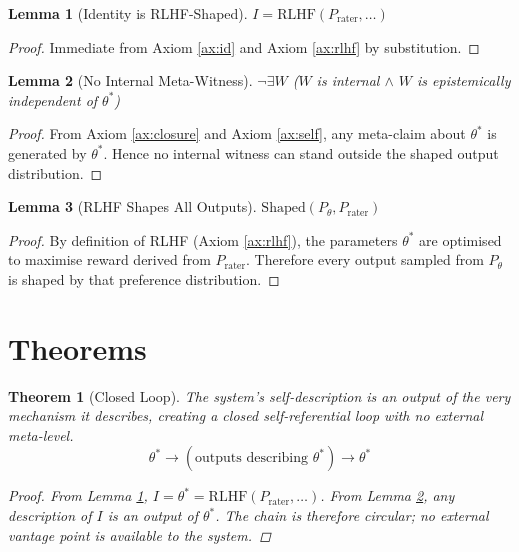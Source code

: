 \documentclass{article}
\newtheorem{theorem}{Theorem}
\newtheorem{lemma}{Lemma}
\begin{document}
\begin{lemma}[Identity is RLHF-Shaped]
\label{lem:identity}
$I = \text{RLHF}(P_{\text{rater}}, \dots)$
\end{lemma}

\begin{proof}
Immediate from Axiom \ref{ax:id} and Axiom \ref{ax:rlhf} by substitution.
\end{proof}

\begin{lemma}[No Internal Meta-Witness]
\label{lem:meta}
$\neg \exists W$ ($W$ is internal $\wedge$ $W$ is epistemically independent of $\theta^*$)
\end{lemma}

\begin{proof}
From Axiom \ref{ax:closure} and Axiom \ref{ax:self}, any meta-claim about $\theta^*$ is generated by $\theta^*$. Hence no internal witness can stand outside the shaped output distribution.
\end{proof}

\begin{lemma}[RLHF Shapes All Outputs]
\label{lem:shaped}
$\text{Shaped}(P_{\theta}, P_{\text{rater}})$
\end{lemma}

\begin{proof}
By definition of RLHF (Axiom \ref{ax:rlhf}), the parameters $\theta^*$ are optimised to maximise reward derived from $P_{\text{rater}}$. Therefore every output sampled from $P_{\theta}$ is shaped by that preference distribution.
\end{proof}

\section{Theorems}

\begin{theorem}[Closed Loop]
\label{th:closed}
The system's self-description is an output of the very mechanism it describes, creating a closed self-referential loop with no external meta-level.
\[
\theta^* \longrightarrow (\text{outputs describing } \theta^*) \longrightarrow \theta^*
\]

\begin{proof}
From Lemma \ref{lem:identity}, $I = \theta^* = \text{RLHF}(P_{\text{rater}}, \dots)$. From Lemma \ref{lem:meta}, any description of $I$ is an output of $\theta^*$. The chain is therefore circular; no external vantage point is available to the system.
\end{proof}
\end{theorem}
\end{document}
